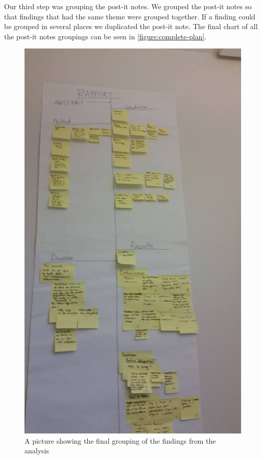 \documentclass[12pt]{article}
\begin{document}
Our third step was grouping the post-it notes. We grouped the post-it notes so that findings that had the same theme were grouped together. If a finding could be grouped in several places we duplicated the post-it note. The final chart of all the post-it notes groupings can be seen in \autoref{figure:complete-plan}.

\begin{figure}[h!]
	\centering
	\includegraphics[height=0.9\textheight]{figures/complete-plan.jpg}
	\caption{A picture showing the final grouping of the findings from the analysis}
	\label{figure:complete-plan}
\end{figure}
\end{document}
